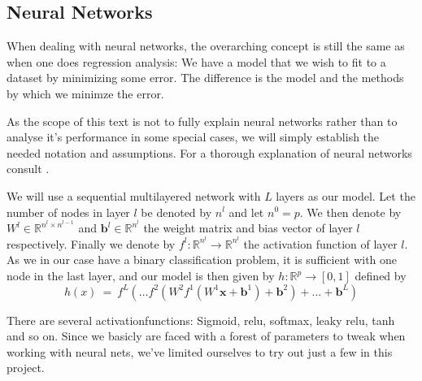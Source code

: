 \documentclass[a4paper,english]{article}
\begin{document}
\subsection{Neural Networks}
When dealing with neural networks, the overarching concept is still the 
same as when one does regression analysis: We have a model that we wish 
to fit to a dataset by minimizing some error. The difference 
is the model and the methods by which we minimze the error.
\par
As the scope of this text is not to fully explain neural networks
rather than to analyse it's performance in some special cases, we will
simply establish the needed notation and assumptions. For a thorough
explanation of neural networks consult \cite{hastie_NN}.
\par
We will use a sequential multilayered network with $L$ layers as our model.
Let the number of nodes in layer $l$ be denoted by $n^l$ and let 
$n^0 = p$. We then denote
by $W^l \in \mathbb{R}^{n^l \times n^{l-1}}$ and 
$\bm{b}^l \in \mathbb{R}^{n^l}$ the weight matrix and bias 
vector of layer $l$ respectively. 
Finally we denote by $f^l: \mathbb{R}^{n^l} \rightarrow \mathbb{R}^{n^l}$ 
the activation function of 
layer $l$. As we in our case have a binary classification problem,
it is sufficient with one node in the last layer, and our model is then
given by $h: \mathbb{R}^p \rightarrow [0,1]$ defined by
\begin{equation}
    h(x) \ = \ f^L( \dots f^2(W^2 f^1(W^1 \bm{x} + \bm{b}^1) + \bm{b}^2) 
    + \dots + \bm{b}^L)
\end{equation}



There are several activationfunctions: Sigmoid, relu, softmax, 
leaky relu, tanh and
so on. Since we basicly are faced with a forest of parameters to tweak
when working with neural nets, we've limited ourselves to try out just a
few in this project.
\end{document}
